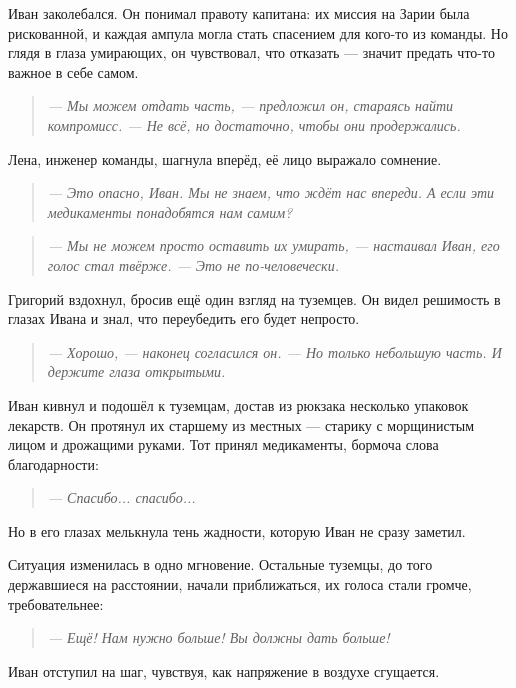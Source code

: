 \documentclass[12pt,a4paper]{book}
\newenvironment{dialogue}{\begin{quote}\itshape}{\end{quote}}
\begin{document}
Иван заколебался. Он понимал правоту капитана: их миссия на Зарии была рискованной, и каждая ампула могла стать спасением для кого-то из команды. Но глядя в глаза умирающих, он чувствовал, что отказать --- значит предать что-то важное в себе самом.

\begin{dialogue}
--- Мы можем отдать часть, --- предложил он, стараясь найти компромисс. --- Не всё, но достаточно, чтобы они продержались.
\end{dialogue}

Лена, инженер команды, шагнула вперёд, её лицо выражало сомнение.

\begin{dialogue}
--- Это опасно, Иван. Мы не знаем, что ждёт нас впереди. А если эти медикаменты понадобятся нам самим?
\end{dialogue}

\begin{dialogue}
--- Мы не можем просто оставить их умирать, --- настаивал Иван, его голос стал твёрже. --- Это не по-человечески.
\end{dialogue}

Григорий вздохнул, бросив ещё один взгляд на туземцев. Он видел решимость в глазах Ивана и знал, что переубедить его будет непросто.

\begin{dialogue}
--- Хорошо, --- наконец согласился он. --- Но только небольшую часть. И держите глаза открытыми.
\end{dialogue}

Иван кивнул и подошёл к туземцам, достав из рюкзака несколько упаковок лекарств. Он протянул их старшему из местных --- старику с морщинистым лицом и дрожащими руками. Тот принял медикаменты, бормоча слова благодарности:

\begin{dialogue}
--- Спасибо... спасибо...
\end{dialogue}

Но в его глазах мелькнула тень жадности, которую Иван не сразу заметил.

Ситуация изменилась в одно мгновение. Остальные туземцы, до того державшиеся на расстоянии, начали приближаться, их голоса стали громче, требовательнее:

\begin{dialogue}
--- Ещё! Нам нужно больше! Вы должны дать больше!
\end{dialogue}

Иван отступил на шаг, чувствуя, как напряжение в воздухе сгущается.
\end{document}
